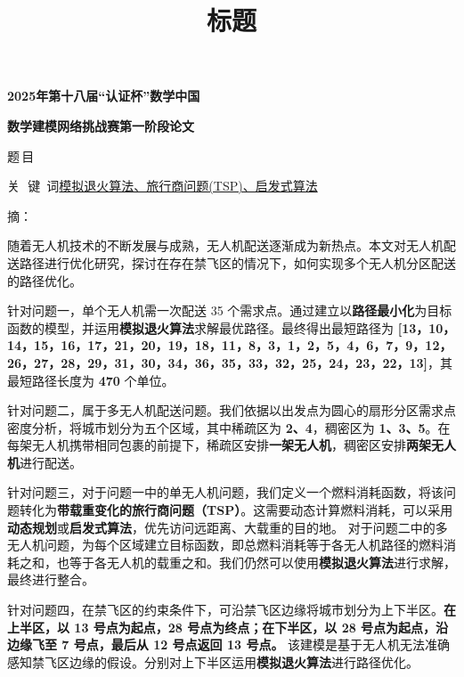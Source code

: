 \documentclass[a4paper]{article} %
\title{\textbf{标题}}
\date{}
\author{}
\begin{document}
  
{\songti 

    
    \begin{center}
    {\songti \textbf{2025年第十八届“认证杯”数学中国}}
\end{center}

\begin{center}
    {\songti \textbf{数学建模网络挑战赛第一阶段论文}}
\end{center}

    {\songti 题\quad\quad\,目}

    {\songti 关 \,\,键\,\,\,词\qquad \underline{模拟退火算法、旅行商问题(TSP)、启发式算法}}

    \begin{center}
    { 摘\qquad{}：}
\end{center}

随着无人机技术的不断发展与成熟，无人机配送逐渐成为新热点。本文对无人机配送路径进行优化研究，探讨在存在禁飞区的情况下，如何实现多个无人机分区配送的路径优化。

针对问题一，单个无人机需一次配送 35 个需求点。通过建立以\textbf{路径最小化}为目标函数的模型，并运用\textbf{模拟退火算法}求解最优路径。最终得出最短路径为 \textbf{[13，10，14，15，16，17，21，20，19，18，11，8，3，1，2，5，4，6，7，9，12，26，27，28，29，31，30，34，36，35，33，32，25，24，23，22，13]}，其最短路径长度为 \textbf{470} 个单位。

针对问题二，属于多无人机配送问题。我们依据以出发点为圆心的扇形分区需求点密度分析，将城市划分为五个区域，其中稀疏区为 \textbf{2、4}，稠密区为 \textbf{1、3、5}。在每架无人机携带相同包裹的前提下，稀疏区安排\textbf{一架无人机}，稠密区安排\textbf{两架无人机}进行配送。

针对问题三，对于问题一中的单无人机问题，我们定义一个燃料消耗函数，将该问题转化为\textbf{带载重变化的旅行商问题（TSP）}。这需要动态计算燃料消耗，可以采用\textbf{动态规划}或\textbf{启发式算法}，优先访问远距离、大载重的目的地。
对于问题二中的多无人机问题，为每个区域建立目标函数，即总燃料消耗等于各无人机路径的燃料消耗之和，也等于各无人机的载重之和。我们仍然可以使用\textbf{模拟退火算法}进行求解，最终进行整合。

针对问题四，在禁飞区的约束条件下，可沿禁飞区边缘将城市划分为上下半区。\textbf{在上半区，以 13 号点为起点，28 号点为终点；在下半区，以 28 号点为起点，沿边缘飞至 7 号点，最后从 12 号点返回 13 号点。} 该建模是基于无人机无法准确感知禁飞区边缘的假设。分别对上下半区运用\textbf{模拟退火算法}进行路径优化。

}
\end{document}
